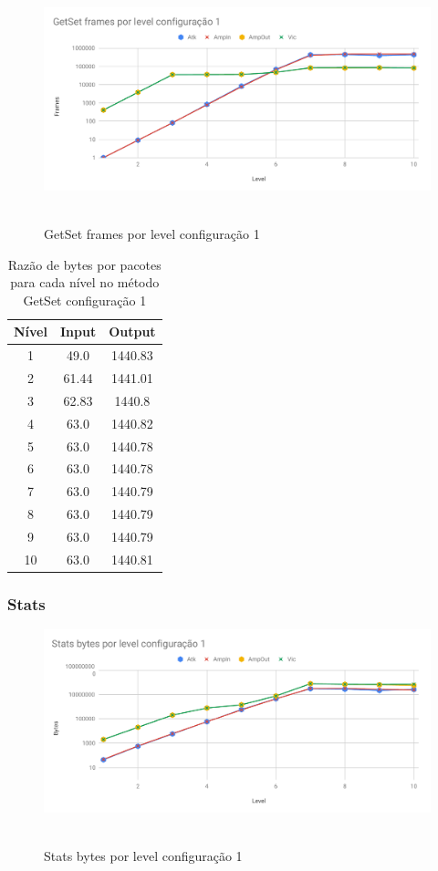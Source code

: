 \begin{figure}[H]
     \centering
     \label{graf:GetSetFrames1}
     \includegraphics[scale=0.6]{img/capturas/GetSetFLC1.pdf}\
     \caption{GetSet frames por level configuração 1}
\end{figure}

\begin{table}[H]
\centering
\label{tab:bytespacsGetSet1}
\caption{Razão de bytes por pacotes para cada nível no método GetSet configuração 1}
\begin{tabular}{|c|c|c|}
\hline
Nível & Input & Output  \\ \hline
1     & 49.0  & 1440.83 \\ \hline
2     & 61.44 & 1441.01 \\ \hline
3     & 62.83 & 1440.8  \\ \hline
4     & 63.0  & 1440.82 \\ \hline
5     & 63.0  & 1440.78 \\ \hline
6     & 63.0  & 1440.78 \\ \hline
7     & 63.0  & 1440.79 \\ \hline
8     & 63.0  & 1440.79 \\ \hline
9     & 63.0  & 1440.79 \\ \hline
10    & 63.0  & 1440.81 \\ \hline
\end{tabular}
\end{table}

\subsubsection{Stats}

\begin{figure}[H]
     \centering
     \label{graf:StatsBytes1}
     \includegraphics[scale=0.6]{img/capturas/StatsBLC1.pdf}\
     \caption{Stats bytes por level configuração 1}
\end{figure}

